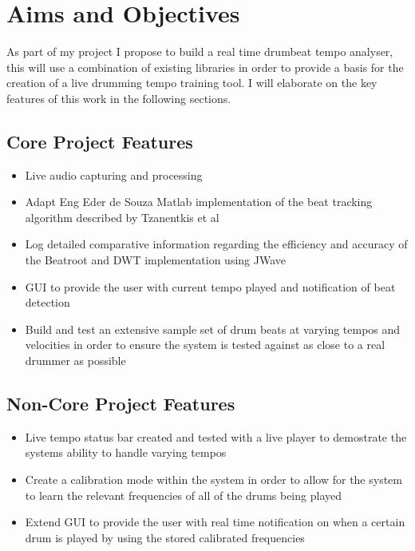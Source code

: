 \documentclass[a4paper, 11pt]{article}
\begin{document}
\maketitle{}
\section{Aims and Objectives}

As part of my project I propose to build a real time drumbeat tempo analyser, this will use a combination of existing libraries in order to provide a basis for the creation of a live drumming tempo training tool. I will elaborate on the key features of this work in the following sections.


\subsection{Core Project Features}
\begin{itemize}
\item Live audio capturing and processing
\item Adapt Eng Eder de Souza Matlab implementation of the beat tracking algorithm described by Tzanentkis et al 
\item Log detailed comparative information regarding the efficiency and accuracy of the Beatroot and DWT implementation using JWave
\item GUI to provide the user with current tempo played and notification of beat detection
\item Build and test an extensive sample set of drum beats at varying tempos and velocities in order to ensure the system is tested against as close to a real drummer as possible
\end{itemize}

\subsection{Non-Core Project Features}
\begin{itemize}
\item Live tempo status bar created and tested with a live player to demostrate the systems ability to handle varying tempos
\item Create a calibration mode within the system in order to allow for the system to learn the relevant frequencies of all of the drums being played
\item Extend GUI to provide the user with real time notification on when a certain drum is played by using the stored calibrated frequencies
\end{itemize}
\end{document}
